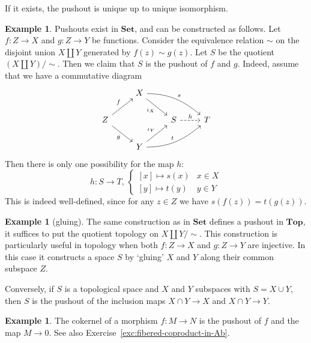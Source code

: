 \documentclass[11pt]{amsbook}
\def\Set{\mathbf{Set}}
\def\Top{\mathbf{Top}}
\theoremstyle{plain}
\theoremstyle{definition}
\newtheorem{example}[theorem]{Example}
\begin{document}
If it exists, the pushout is unique up to unique isomorphism. 
 
\begin{example}Pushouts exist in $\Set$, and can be constructed as follows. Let $f\colon Z\to X$ and $g\colon Z\to Y$ be functions. Consider the equivalence relation $\sim$ on the disjoint union $X\amalg Y$ generated by $f(z) \sim g(z)$. Let $S$ be the quotient $(X\amalg Y)/\sim$. Then we claim that $S$ is the pushout of $f$ and $g$. Indeed, assume that we have a commutative diagram
\[
\begin{tikzcd}
&X \arrow[swap]{rd}{\iota_X} \arrow[out=-1,in=140]{rrd}{s} & & \\
Z \arrow{ru}{f} \arrow[swap]{rd}{g} && S \arrow[dashed]{r}{h} & T \\
 & Y \arrow{ru}{\iota_Y} \arrow[out=1,in=-140]{rru}{t} & & 
\end{tikzcd}
\]
Then there is only one possibility for the map $h$:
\[
	h\colon S \to T,\,
	\begin{cases} [x] \mapsto s(x) & x\in X \\ [y] \mapsto t(y) & y\in Y
	\end{cases}
\]
This is indeed well-defined, since for any $z\in Z$ we have $s(f(z))=t(g(z))$.
\end{example}

\begin{example}[gluing]
The same construction as in $\Set$ defines a pushout in $\Top$, it suffices to put the quotient topology on $X\amalg Y/\sim$.  This construction is particularly useful in topology when both $f\colon Z\to X$ and $g\colon Z\to Y$ are injective. In this case it constructs a space $S$ by `gluing' $X$ and $Y$ along their common subspace $Z$. 

Conversely, if $S$ is a topological space and $X$ and $Y$ subspaces with $S = X \cup Y$, then $S$ is the pushout of the inclusion maps $X\cap Y \to X$ and $X\cap Y \to Y$.
\end{example}

\begin{example}The cokernel of a morphism $f\colon M\to N$ is the pushout of $f$ and the map $M\to 0$. See also Exercise~\ref{exc:fibered-coproduct-in-Ab}.
\end{example}
\end{document}
